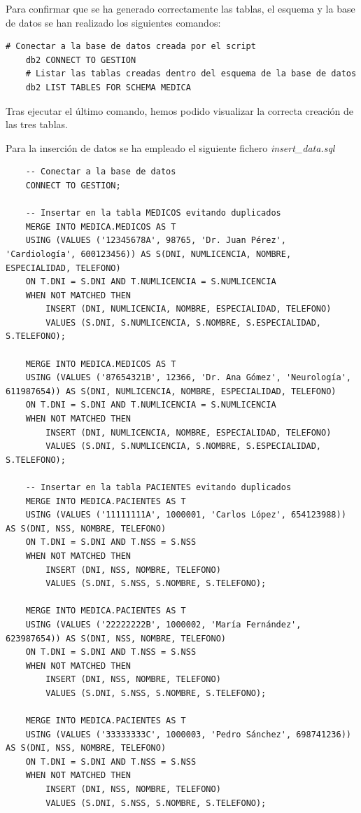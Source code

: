 \documentclass{article}
\begin{document}
\newline
Para confirmar que se ha generado correctamente las tablas, el esquema y la base de datos se han realizado los siguientes comandos:
\begin{lstlisting}[style=bashStyle]
    # Conectar a la base de datos creada por el script
    db2 CONNECT TO GESTION
    # Listar las tablas creadas dentro del esquema de la base de datos
    db2 LIST TABLES FOR SCHEMA MEDICA
\end{lstlisting}
Tras ejecutar el último comando, hemos podido visualizar la correcta creación de las tres tablas.

Para la inserción de datos se ha empleado el siguiente fichero \textit{insert\_data.sql}
\begin{verbatim}
    -- Conectar a la base de datos
    CONNECT TO GESTION;

    -- Insertar en la tabla MEDICOS evitando duplicados
    MERGE INTO MEDICA.MEDICOS AS T
    USING (VALUES ('12345678A', 98765, 'Dr. Juan Pérez', 'Cardiología', 600123456)) AS S(DNI, NUMLICENCIA, NOMBRE, ESPECIALIDAD, TELEFONO)
    ON T.DNI = S.DNI AND T.NUMLICENCIA = S.NUMLICENCIA
    WHEN NOT MATCHED THEN
        INSERT (DNI, NUMLICENCIA, NOMBRE, ESPECIALIDAD, TELEFONO)
        VALUES (S.DNI, S.NUMLICENCIA, S.NOMBRE, S.ESPECIALIDAD, S.TELEFONO);

    MERGE INTO MEDICA.MEDICOS AS T
    USING (VALUES ('87654321B', 12366, 'Dr. Ana Gómez', 'Neurología', 611987654)) AS S(DNI, NUMLICENCIA, NOMBRE, ESPECIALIDAD, TELEFONO)
    ON T.DNI = S.DNI AND T.NUMLICENCIA = S.NUMLICENCIA
    WHEN NOT MATCHED THEN
        INSERT (DNI, NUMLICENCIA, NOMBRE, ESPECIALIDAD, TELEFONO)
        VALUES (S.DNI, S.NUMLICENCIA, S.NOMBRE, S.ESPECIALIDAD, S.TELEFONO);

    -- Insertar en la tabla PACIENTES evitando duplicados
    MERGE INTO MEDICA.PACIENTES AS T
    USING (VALUES ('11111111A', 1000001, 'Carlos López', 654123988)) AS S(DNI, NSS, NOMBRE, TELEFONO)
    ON T.DNI = S.DNI AND T.NSS = S.NSS
    WHEN NOT MATCHED THEN
        INSERT (DNI, NSS, NOMBRE, TELEFONO)
        VALUES (S.DNI, S.NSS, S.NOMBRE, S.TELEFONO);

    MERGE INTO MEDICA.PACIENTES AS T
    USING (VALUES ('22222222B', 1000002, 'María Fernández', 623987654)) AS S(DNI, NSS, NOMBRE, TELEFONO)
    ON T.DNI = S.DNI AND T.NSS = S.NSS
    WHEN NOT MATCHED THEN
        INSERT (DNI, NSS, NOMBRE, TELEFONO)
        VALUES (S.DNI, S.NSS, S.NOMBRE, S.TELEFONO);

    MERGE INTO MEDICA.PACIENTES AS T
    USING (VALUES ('33333333C', 1000003, 'Pedro Sánchez', 698741236)) AS S(DNI, NSS, NOMBRE, TELEFONO)
    ON T.DNI = S.DNI AND T.NSS = S.NSS
    WHEN NOT MATCHED THEN
        INSERT (DNI, NSS, NOMBRE, TELEFONO)
        VALUES (S.DNI, S.NSS, S.NOMBRE, S.TELEFONO);


\end{verbatim}
\end{document}
